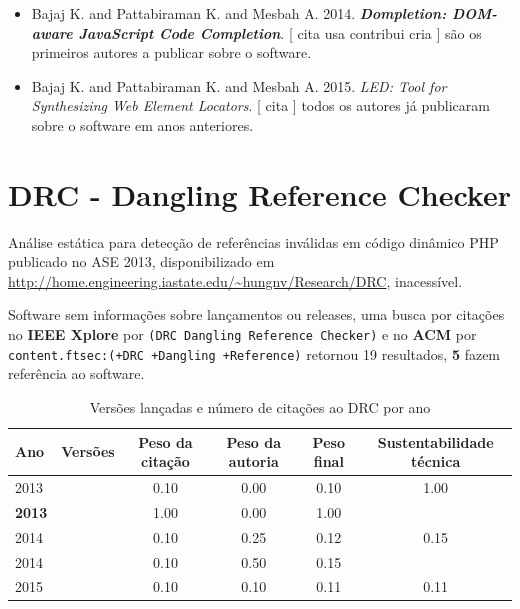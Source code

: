 \begin{itemize}
\item Bajaj K. and Pattabiraman K. and Mesbah A.
      2014.
        \textbf{\textit{ Dompletion: DOM-aware JavaScript Code Completion}}.
      [
          cita
          usa
          contribui
          cria
      ]
são os primeiros autores a publicar sobre o software.
\item Bajaj K. and Pattabiraman K. and Mesbah A.
      2015.
        \textit{ LED: Tool for Synthesizing Web Element Locators}.
      [
          cita
      ]
todos os autores já publicaram sobre o software em anos anteriores.
\end{itemize}
\section{DRC - Dangling Reference Checker}

Análise estática para detecção de referências inválidas em código dinâmico PHP
publicado no ASE 2013,
disponibilizado em \url{http://home.engineering.iastate.edu/~hungnv/Research/DRC},
inacessível.

Software sem informações sobre lançamentos ou releases,
uma busca por citações no {\bf IEEE Xplore} por
\texttt{(DRC Dangling Reference Checker)}
e no {\bf ACM} por
\texttt{content.ftsec:(+DRC +Dangling +Reference)}
retornou
19 resultados,
{\bf 5} fazem referência ao software.


\begin{table}[H]
\caption{Versões lançadas e número de citações ao DRC por ano}
\centering
\begin{tabular}{| l | c | c | c | c | c |}
  \hline
  Ano & Versões & Peso da citação & Peso da autoria & Peso final & Sustentabilidade técnica \\
  \hline
            2013
          &
          
          &
          0.10
          &
          0.00
          &
          0.10
          &
            {\color{blue} 1.00}
          \\
            {\bf 2013}
          &
          
          &
          1.00
          &
          0.00
          &
          1.00
          &
          \\
\hline
            2014
          &
          
          &
          0.10
          &
          0.25
          &
          0.12
          &
            {\color{red} 0.15}
          \\
            2014
          &
          
          &
          0.10
          &
          0.50
          &
          0.15
          &
          \\
\hline
            2015
          &
          
          &
          0.10
          &
          0.10
          &
          0.11
          &
            {\color{red} 0.11}
          \\
\hline
\end{tabular}
\end{table}

